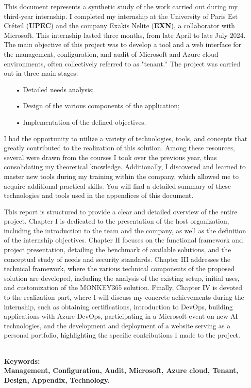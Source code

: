 This document represents a synthetic study of the work carried out during my third-year internship. I completed my internship at the University of Paris Est Créteil (\textbf{UPEC}) and the company Exakis Nelite (\textbf{EXN}), a collaborator with Microsoft. This internship lasted three months, from late April to late July 2024. The main objective of this project was to develop a tool and a web interface for the management, configuration, and audit of Microsoft and Azure cloud environments, often collectively referred to as "tenant." The project was carried out in three main stages:
\begin{itemize}
\item[•] Detailed needs analysis;
\item[•] Design of the various components of the application;
\item[•] Implementation of the defined objectives.
\end{itemize}

I had the opportunity to utilize a variety of technologies, tools, and concepts that greatly contributed to the realization of this solution. Among these resources, several were drawn from the courses I took over the previous year, thus consolidating my theoretical knowledge. Additionally, I discovered and learned to master new tools during my training within the company, which allowed me to acquire additional practical skills. You will find a detailed summary of these technologies and tools used in the appendices of this document.

This report is structured to provide a clear and detailed overview of the entire project. Chapter I is dedicated to the presentation of the host organization, including the introduction to the team and the company, as well as the definition of the internship objectives. Chapter II focuses on the functional framework and project presentation, detailing the benchmark of available solutions, and the conceptual study of needs and security standards. Chapter III addresses the technical framework, where the various technical components of the proposed solution are developed, including the analysis of the existing setup, initial uses, and customization of the MONKEY365 solution. Finally, Chapter IV is devoted to the realization part, where I will discuss my concrete achievements during the internship, such as obtaining certifications, introduction to DevOps, building applications with Azure DevOps, participating in a Microsoft event on new AI technologies, and the development and deployment of a website serving as a personal portfolio, highlighting the specific contributions I made to the project.

\textbf{\\Keywords:\\ Management, Configuration, Audit, Microsoft, Azure cloud, Tenant, Design, Appendix, Technology.}